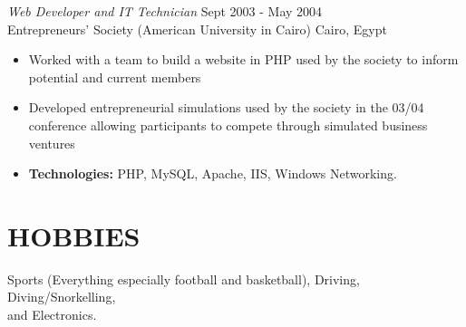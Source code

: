 \documentclass[line,margin]{res}
\begin{document}
\begin{resume}
    {\sl Web Developer and IT Technician} \hfill Sept 2003 - May 2004 \\
    Entrepreneurs' Society (American University in Cairo) \hfill Cairo, Egypt \smallskip
        \begin{itemize}  \itemsep -2pt %
\item Worked with a team to build a website in PHP used by the society to
    inform potential and current members
\item Developed entrepreneurial simulations used by the society in the
    03/04 \\ conference allowing participants to compete through simulated
    business \\ ventures
    \item {\bf Technologies:} \hspace{1pt}
        PHP, MySQL, Apache, IIS, Windows Networking.
        \end{itemize}

\section{HOBBIES}
    Sports (Everything especially football and basketball), Driving,
    Diving/Snorkelling, \\ and Electronics.

\end{resume}
\end{document}
